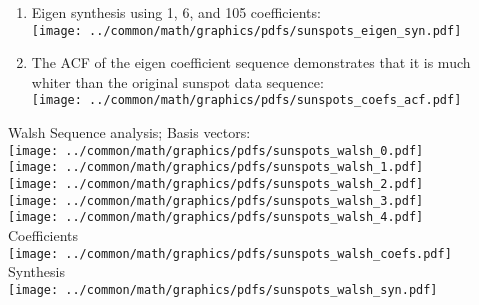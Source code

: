\begin{example}
\begin{enumerate}
\item Eigen synthesis using 1, 6, and 105 coefficients:
\\\texttt{[image: ../common/math/graphics/pdfs/sunspots\_eigen\_syn.pdf]}

\item The ACF of the eigen coefficient sequence demonstrates that
      it is much whiter than the original sunspot data sequence:
\\\texttt{[image: ../common/math/graphics/pdfs/sunspots\_coefs\_acf.pdf]}

\end{enumerate}
\end{example}

\begin{example}
\label{ex:sunspot_period_Walsh}
Walsh Sequence analysis;
Basis vectors:
\\\texttt{[image: ../common/math/graphics/pdfs/sunspots\_walsh\_0.pdf]}
\\\texttt{[image: ../common/math/graphics/pdfs/sunspots\_walsh\_1.pdf]}
\\\texttt{[image: ../common/math/graphics/pdfs/sunspots\_walsh\_2.pdf]}
\\\texttt{[image: ../common/math/graphics/pdfs/sunspots\_walsh\_3.pdf]}
\\\texttt{[image: ../common/math/graphics/pdfs/sunspots\_walsh\_4.pdf]}
\\Coefficients
\\\texttt{[image: ../common/math/graphics/pdfs/sunspots\_walsh\_coefs.pdf]}
\\Synthesis
\\\texttt{[image: ../common/math/graphics/pdfs/sunspots\_walsh\_syn.pdf]}
\end{example}

